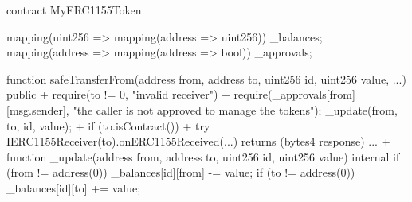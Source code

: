  contract MyERC1155Token {
   mapping(uint256 => mapping(address => uint256)) _balances;
   mapping(address => mapping(address => bool)) _approvals;

   function safeTransferFrom(address from, address to, uint256 id, uint256 value, ...) public {
+    require(to != 0, "invalid receiver")
+    require(_approvals[from][msg.sender], "the caller is not approved to manage the tokens");
     _update(from, to, id, value);
+    if (to.isContract()) {
+      try IERC1155Receiver(to).onERC1155Received(...) returns (bytes4 response) {...}
+    }
   }
   function _update(address from, address to, uint256 id, uint256 value) internal {
     if (from != address(0)) {
       _balances[id][from] -= value;
     }
     if (to != address(0)) {
       _balances[id][to] += value;
     }
   }
 }